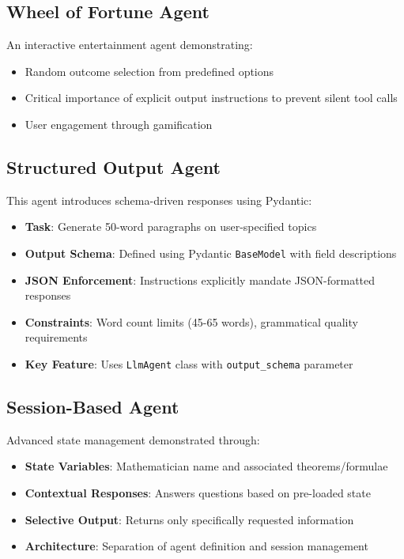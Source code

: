 \documentclass[12pt,a4paper]{article}
\begin{document}
\subsection{Wheel of Fortune Agent}

An interactive entertainment agent demonstrating:
\begin{itemize}
    \item Random outcome selection from predefined options
    \item Critical importance of explicit output instructions to prevent silent tool calls
    \item User engagement through gamification
\end{itemize}

\subsection{Structured Output Agent}

This agent introduces schema-driven responses using Pydantic:
\begin{itemize}
    \item \textbf{Task}: Generate 50-word paragraphs on user-specified topics
    \item \textbf{Output Schema}: Defined using Pydantic \texttt{BaseModel} with field descriptions
    \item \textbf{JSON Enforcement}: Instructions explicitly mandate JSON-formatted responses
    \item \textbf{Constraints}: Word count limits (45-65 words), grammatical quality requirements
    \item \textbf{Key Feature}: Uses \texttt{LlmAgent} class with \texttt{output\_schema} parameter
\end{itemize}

\subsection{Session-Based Agent}

Advanced state management demonstrated through:
\begin{itemize}
    \item \textbf{State Variables}: Mathematician name and associated theorems/formulae
    \item \textbf{Contextual Responses}: Answers questions based on pre-loaded state
    \item \textbf{Selective Output}: Returns only specifically requested information
    \item \textbf{Architecture}: Separation of agent definition and session management
\end{itemize}
\end{document}
